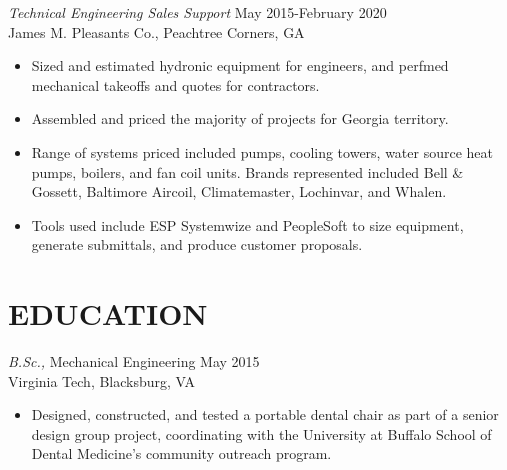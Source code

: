 \documentclass[margin]{res}
\begin{document}
\begin{resume}
    {\sl Technical Engineering Sales Support} \hfill May 2015-February 2020 \\
        James M. Pleasants Co., Peachtree Corners, GA
        \begin{itemize}  \itemsep -2pt %
            \item Sized and estimated hydronic equipment for engineers, and perfmed mechanical takeoffs and quotes for contractors.
            \item Assembled and priced the majority of projects for Georgia territory.
            \item Range of systems priced included pumps, cooling towers, water source heat pumps, boilers, and fan coil units. Brands represented included Bell \& Gossett, Baltimore Aircoil, Climatemaster, Lochinvar, and Whalen.
            \item Tools used include ESP Systemwize and PeopleSoft to size equipment, generate submittals, and produce customer proposals.
            \end{itemize}
 

\section{EDUCATION} {\sl B.Sc.,} Mechanical Engineering \hfill  May 2015 \\
    Virginia Tech, Blacksburg, VA
    \begin{itemize}  \itemsep -2pt %
        \item Designed, constructed, and tested a portable dental chair as part of a senior design group project, coordinating with the University at Buffalo School of Dental Medicine's community outreach program.
    \end{itemize}


\end{resume}
\end{document}
